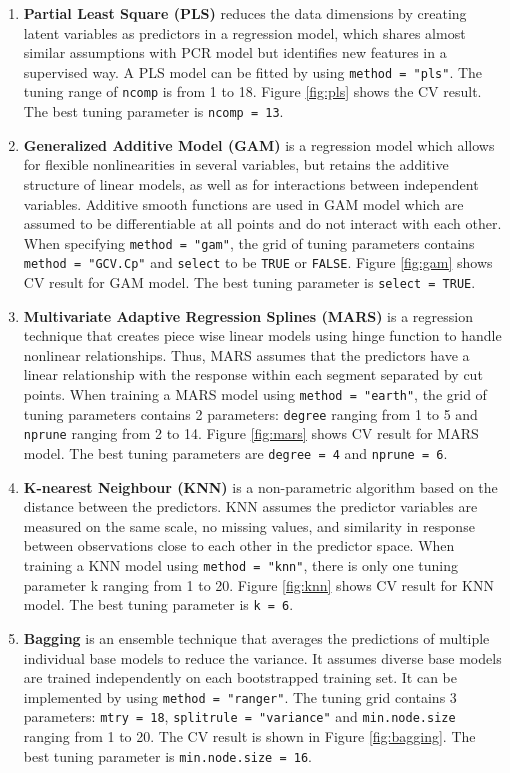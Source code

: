 \documentclass[11pt]{article}
\begin{document}
\begin{enumerate}
\item \textbf{Partial Least Square (PLS)} reduces the data dimensions by creating latent variables as predictors in a regression model, which shares almost similar assumptions with PCR model but identifies new features in a supervised way. A PLS model can be fitted by using \texttt{method = "pls"}. The tuning range of \texttt{ncomp} is from 1 to 18. Figure \ref{fig:pls} shows the CV result. The best tuning parameter is \texttt{ncomp = 13}.
 
\item\textbf{ Generalized Additive Model (GAM)} is a regression model which allows for flexible nonlinearities in several variables, but retains the additive structure of linear models, as well as for interactions between independent variables. Additive smooth functions are used in GAM model which are assumed to be differentiable at all points and do not interact with each other. When specifying \texttt{method = "gam"}, the grid of tuning parameters contains \texttt{method = "GCV.Cp"} and \texttt{select} to be \texttt{TRUE} or \texttt{FALSE}. Figure \ref{fig:gam} shows CV result for GAM model. The best tuning parameter is \texttt{select = TRUE}.

\item \textbf{Multivariate Adaptive Regression Splines (MARS)} is a regression technique that creates piece wise linear models using hinge function to handle nonlinear relationships. Thus, MARS assumes that the predictors have a linear relationship with the response within each segment separated by cut points. When training a MARS model using \texttt{method = "earth"}, the grid of tuning parameters contains 2 parameters: \texttt{degree} ranging from 1 to 5 and \texttt{nprune} ranging from 2 to 14. Figure \ref{fig:mars} shows CV result for MARS model. The best tuning parameters are \texttt{degree = 4} and \texttt{nprune = 6}.

\item \textbf{K-nearest Neighbour (KNN)} is a non-parametric algorithm based on the distance between the predictors. KNN assumes the predictor variables are measured on the same scale, no missing values, and similarity in response between observations close to each other in the predictor space. When training a KNN model using \texttt{method = "knn"}, there is only one tuning parameter k ranging from 1 to 20. Figure \ref{fig:knn} shows CV result for KNN model. The best tuning parameter is \texttt{k = 6}.

\item \textbf{Bagging} is an ensemble technique that averages the predictions of multiple individual base models to reduce the variance. It assumes diverse base models are trained independently on each bootstrapped training set. It can be implemented by using \texttt{method = "ranger"}. The tuning grid contains 3 parameters: \texttt{mtry = 18}, \texttt{splitrule = "variance"} and \texttt{min.node.size} ranging from 1 to 20. The CV result is shown in Figure \ref{fig:bagging}. The best tuning parameter is \texttt{min.node.size = 16}. 


\end{enumerate}
\end{document}

